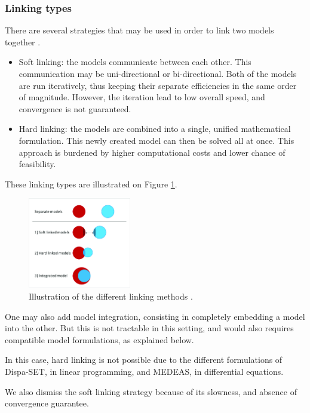 \subsubsection{Linking types}

There are several strategies that may be used in order to link two models together \cite{linkings-stuff}.

\begin{itemize}
    \item Soft linking: the models communicate between each other. This communication may be uni-directional or bi-directional. Both of the models are run iteratively, thus keeping their separate efficiencies in the same order of magnitude. However, the iteration lead to low overall speed, and convergence is not guaranteed.
    \item Hard linking: the models are combined into a single, unified mathematical formulation. This newly created model can then be solved all at once. This approach is burdened by higher computational costs and lower chance of feasibility.
\end{itemize}

These linking types are illustrated on Figure \ref{fig:linking-types}.

\begin{figure}[h]
    \centering
    \includegraphics[width=0.4\textwidth]{resources/images/hybrid_model_variants.png}
    \caption{Illustration of the different linking methods \cite{hybrid_models}.}
    \label{fig:linking-types}
\end{figure}

One may also add model integration, consisting in completely embedding a model into the other. But this is not tractable in this setting, and would also requires compatible model formulations, as explained below.

In this case, hard linking is not possible due to the different formulations of Dispa-SET, in linear programming, and MEDEAS, in differential equations.

We also dismiss the soft linking strategy because of its slowness, and absence of convergence guarantee.

